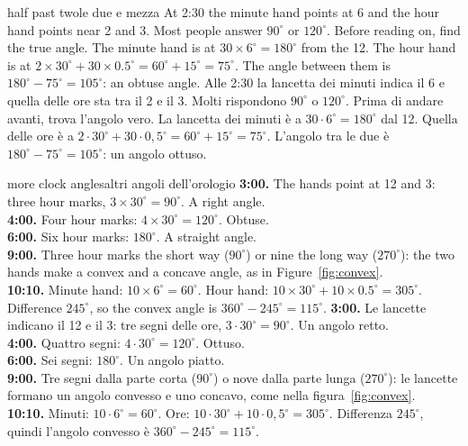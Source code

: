 \begin{think}{half past two}{le due e mezza}
At 2:30 the minute hand points at 6 and the hour hand points near 2 and 3. Most people answer $90^\circ$ or $120^\circ$. Before reading on, find the true angle.
\answer The minute hand is at $30 \times 6^\circ = 180^\circ$ from the 12. The hour hand is at $2 \times 30^\circ + 30 \times 0.5^\circ = 60^\circ + 15^\circ = 75^\circ$. The angle between them is $180^\circ - 75^\circ = 105^\circ$: an obtuse angle.
\tcblower
Alle 2:30 la lancetta dei minuti indica il 6 e quella delle ore sta tra il 2 e il 3. Molti rispondono $90^\circ$ o $120^\circ$. Prima di andare avanti, trova l'angolo vero.
\answer La lancetta dei minuti è a $30 \cdot 6^\circ = 180^\circ$ dal 12. Quella delle ore è a $2 \cdot 30^\circ + 30 \cdot 0{,}5^\circ = 60^\circ + 15^\circ = 75^\circ$. L'angolo tra le due è $180^\circ - 75^\circ = 105^\circ$: un angolo ottuso.
\end{think}

\begin{example}{more clock angles}{altri angoli dell'orologio}
\textbf{3:00.} The hands point at 12 and 3: three hour marks, $3 \times 30^\circ = 90^\circ$. A right angle.\\
\textbf{4:00.} Four hour marks: $4 \times 30^\circ = 120^\circ$. Obtuse.\\
\textbf{6:00.} Six hour marks: $180^\circ$. A straight angle.\\
\textbf{9:00.} Three hour marks the short way ($90^\circ$) or nine the long way ($270^\circ$): the two hands make a convex and a concave angle, as in Figure~\ref{fig:convex}.\\
\textbf{10:10.} Minute hand: $10 \times 6^\circ = 60^\circ$. Hour hand: $10 \times 30^\circ + 10 \times 0.5^\circ = 305^\circ$. Difference $245^\circ$, so the convex angle is $360^\circ - 245^\circ = 115^\circ$.
\tcblower
\textbf{3:00.} Le lancette indicano il 12 e il 3: tre segni delle ore, $3 \cdot 30^\circ = 90^\circ$. Un angolo retto.\\
\textbf{4:00.} Quattro segni: $4 \cdot 30^\circ = 120^\circ$. Ottuso.\\
\textbf{6:00.} Sei segni: $180^\circ$. Un angolo piatto.\\
\textbf{9:00.} Tre segni dalla parte corta ($90^\circ$) o nove dalla parte lunga ($270^\circ$): le lancette formano un angolo convesso e uno concavo, come nella figura~\ref{fig:convex}.\\
\textbf{10:10.} Minuti: $10 \cdot 6^\circ = 60^\circ$. Ore: $10 \cdot 30^\circ + 10 \cdot 0{,}5^\circ = 305^\circ$. Differenza $245^\circ$, quindi l'angolo convesso è $360^\circ - 245^\circ = 115^\circ$.
\end{example}

